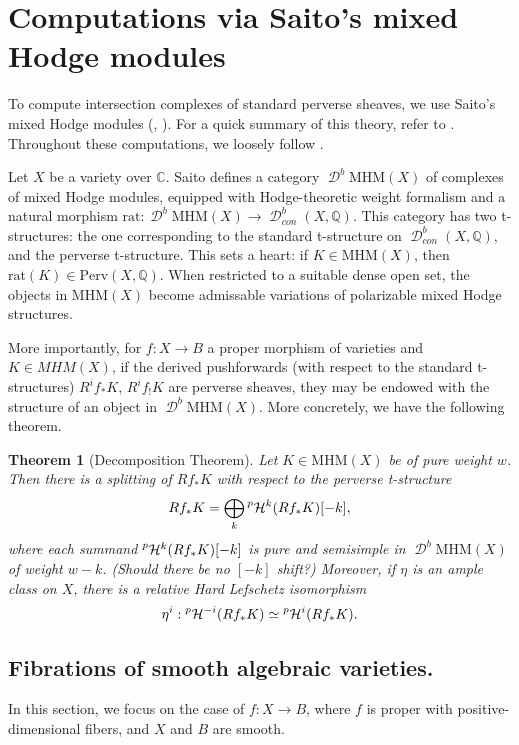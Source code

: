 \documentclass[12pt]{amsart}
\newcommand{\Q}{\mathbb{Q}}
\newcommand{\C}{\mathbb{C}}
\DeclareMathOperator{\D}{\mathcal{D}}
\newcommand{\pH}{\prescript{p}{}{\mathcal{H}}}
\newtheorem{theorem}{Theorem}[section]
\theoremstyle{definition}
\theoremstyle{remark}
\numberwithin{equation}{section}
\begin{document}
\section{Computations via Saito's mixed Hodge modules}
To compute intersection complexes of standard perverse sheaves, we use Saito's 
mixed Hodge modules (\cite{saito88-HM}, \cite{saito90-MHM}). For a quick summary of 
this theory, refer to \cite[\S 2.1]{deC-Rap-Sac21}. Throughout these computations,
we loosely follow \cite[\S 2]{deC-Mig09}.

Let \(X\) be a variety over \(\C\). Saito \cite{saito90-MHM} defines a category
\(\D^b \mathrm{MHM}(X)\) of complexes of mixed Hodge modules, equipped with
Hodge-theoretic weight formalism and a natural morphism
\(\mathrm{rat}: \D^b \mathrm{MHM}(X) \to \D^b_{con}(X, \Q)\). This category 
has two t-structures: the one corresponding to the standard t-structure on 
\(\D^b_{con}(X, \Q)\), and the perverse t-structure. This sets a heart:
if \(K \in \mathrm{MHM}(X)\), then \(\mathrm{rat}(K) \in \mathrm{Perv}(X, \Q)\).
When restricted to a suitable dense open set, the objects in \(\mathrm{MHM}(X)\) 
become admissable variations of polarizable mixed Hodge structures.

More importantly, for \(f: X \to B\) a proper morphism of varieties and 
\(K \in MHM(X)\), if the derived pushforwards (with respect to the standard t-structures)
\(R^i f_* K\), \(R^i f_! K\) are perverse sheaves, they may be endowed with the 
structure of an object in \(\D^b \mathrm{MHM}(X)\). More concretely, 
we have the following theorem.

\begin{theorem}[Decomposition Theorem]
    Let \(K \in \mathrm{MHM}(X)\) be of pure weight \(w\). Then there is a splitting 
    of \(Rf_* K\) with respect to the perverse t-structure 
    \begin{equation}
        Rf_* K = \bigoplus_{k} \pH^k(Rf_* K)[-k],
    \end{equation}
    where each summand \(\pH^k(Rf_* K)[-k]\) is pure and semisimple in 
    \(\D^b \mathrm{MHM}(X)\) of weight \(w-k\). (Should there be no \([-k]\) shift?) 
    Moreover, if \(\eta\) is an ample class on \(X\), there is a relative Hard 
    Lefschetz isomorphism
    \begin{equation}
        \eta^i: \pH^{-i}(Rf_* K) \simeq \pH^i(Rf_* K).
    \end{equation}
\end{theorem}

\subsection{Fibrations of smooth algebraic varieties.}
In this section, we focus on the case of \(f: X \to B\), where \(f\) is proper with 
positive-dimensional fibers, and \(X\) and \(B\) are smooth. 
\end{document}

